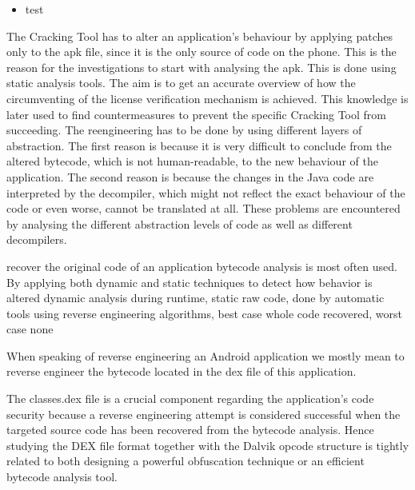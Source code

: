 \begin{itemize}
    \item test
\end{itemize}
The Cracking Tool has to alter an application's behaviour by applying patches only to the \gls{apk} file, since it is the only source of code on the phone. This is the reason for the investigations to start with analysing the \gls{apk}. This is done using static analysis tools. The aim is to get an accurate overview of how the circumventing of the license verification mechanism is achieved. This knowledge is later used to find countermeasures to prevent the specific Cracking Tool from succeeding.\newline
The reengineering has to be done by using different layers of abstraction. The first reason is because it is very difficult to conclude from the altered bytecode, which is not human-readable, to the new behaviour of the application. The second reason is because the changes in the Java code are interpreted by the decompiler, which might not reflect the exact behaviour of the code or even worse, cannot be translated at all.\newline
These problems are encountered by analysing the different abstraction levels of code as well as different decompilers.

%
recover the original code of an application bytecode analysis is most
often used. By applying both dynamic and static techniques to detect how behavior is altered\newline
dynamic analysis during runtime, static raw code, done by automatic tools using reverse engineering algorithms, best case whole code recovered, worst case none

When speaking of reverse engineering an Android application we mostly mean to reverse engineer the bytecode located in the dex file of this application.

The classes.dex file is a crucial component regarding the application’s code security because a reverse engineering attempt is considered successful when the targeted source code has been recovered from the bytecode analysis. Hence studying the DEX file format together with the Dalvik opcode structure is tightly related to both designing a powerful obfuscation technique or an efficient bytecode analysis tool.
\cite{kovachevaMaster}
%

